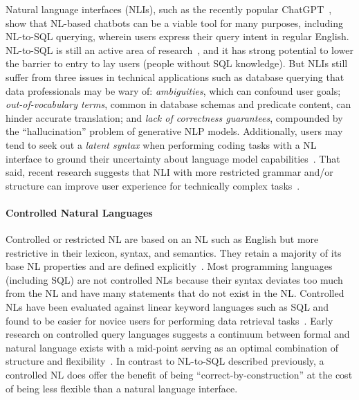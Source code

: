 Natural language interfaces (NLIs), such as the recently popular ChatGPT~\cite{radford2018improving, https://doi.org/10.48550/arxiv.2005.14165, openai-chatgpt-blog-post}, show that NL-based chatbots can be a viable tool for many purposes, including NL-to-SQL querying, wherein users express their query intent in regular English. NL-to-SQL is still an active area of research~\cite{Kim2020, https://doi.org/10.48550/arxiv.2005.14165, Scholak2021:PICARD, https://doi.org/10.48550/arxiv.2201.05966, 10.1145/3318464.3383128}, and it has strong potential to lower the barrier to entry to lay users (people without SQL knowledge).
But NLIs still suffer from three issues in technical applications such as database querying that data professionals may be wary of: \textit{ambiguities}, which can confound user goals; \textit{out-of-vocabulary terms}, common in database schemas and predicate content, can hinder accurate translation; and \textit{lack of correctness guarantees}, compounded by the ``hallucination'' problem of generative NLP models. Additionally, users may tend to seek out a \emph{latent syntax} when performing coding tasks with a NL interface to ground their uncertainty about language model capabilities~\cite{10.1145/3491102.3501870}.
That said, recent research suggests that NLI with more restricted grammar and/or structure can improve user experience for technically complex tasks~\cite{mu2019do}.

\paragraph{Controlled Natural Languages}

Controlled or restricted NL are based on an NL such as English but more restrictive in their lexicon, syntax, and semantics. 
They retain a majority of its base NL properties and are defined explicitly~\cite{10.1162/COLI_a_00168}. 
Most programming languages (including SQL) are not controlled NLs because their syntax deviates too much from the NL and have many statements that do not exist in the NL. 
Controlled NLs have been evaluated against linear keyword languages such as SQL and found to be easier for novice users for performing data retrieval tasks~\cite{doi:10.1287/isre.3.3.252}. Early research on controlled query languages suggests a continuum between formal and natural language exists with a mid-point serving as an optimal combination of structure and flexibility~\cite{10.1145/800045.801602}.
In contrast to NL-to-SQL described previously, a controlled NL does offer the benefit of being ``correct-by-construction'' at the cost of being less flexible than a natural language interface.

